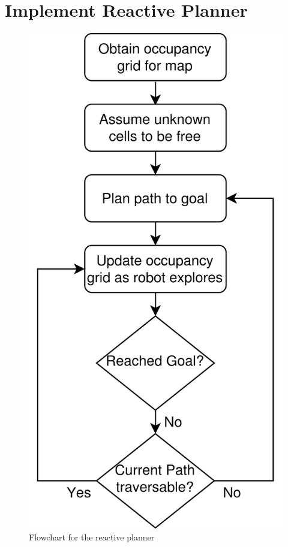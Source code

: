 \documentclass[a4paper,12pt]{article}
\begin{document}
	\pagebreak
	
	\tableofcontents
	
	\pagebreak
	
	\section{Implement Reactive Planner }
		\begin{figure}[H]
			\label{ReactivePlannerFlowchart}
			\centering
			
			\includegraphics[scale=0.13]{images/ReactivePlannerFlowchart.png}
			\caption{Flowchart for the reactive planner}
		\end{figure}
	
\end{document}
